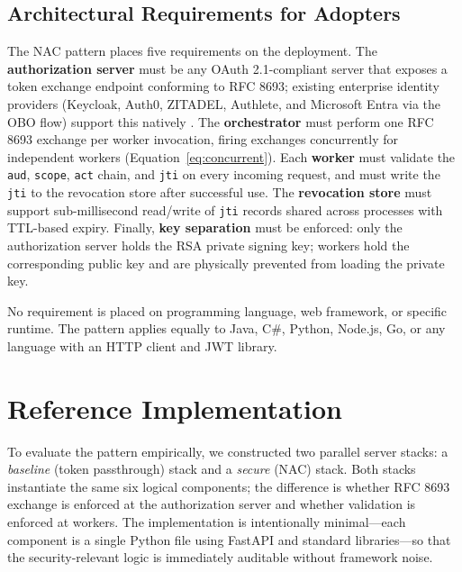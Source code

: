 \documentclass[journal]{IEEEtran}
\begin{document}
\subsection{Architectural Requirements for Adopters}

The NAC pattern places five requirements on the deployment. The
\textbf{authorization server} must be any OAuth 2.1-compliant server that
exposes a token exchange endpoint conforming to RFC 8693; existing enterprise
identity providers (Keycloak, Auth0, ZITADEL, Authlete, and Microsoft Entra via
the OBO flow) support this natively \cite{rfc8693_deploy}. The
\textbf{orchestrator} must perform one RFC 8693 exchange per worker invocation,
firing exchanges concurrently for independent workers
(Equation~\ref{eq:concurrent}). Each \textbf{worker} must validate the
\texttt{aud}, \texttt{scope}, \texttt{act} chain, and \texttt{jti} on every
incoming request, and must write the \texttt{jti} to the revocation store after
successful use. The \textbf{revocation store} must support sub-millisecond
read/write of \texttt{jti} records shared across processes with TTL-based
expiry. Finally, \textbf{key separation} must be enforced: only the
authorization server holds the RSA private signing key; workers hold the
corresponding public key and are physically prevented from loading the private
key.

No requirement is placed on programming language, web framework, or specific
runtime. The pattern applies equally to Java, C\#, Python, Node.js, Go, or any
language with an HTTP client and JWT library.


\section{Reference Implementation}
\label{sec:impl}

To evaluate the pattern empirically, we constructed two parallel server stacks:
a \textit{baseline} (token passthrough) stack and a \textit{secure} (NAC) stack.
Both stacks instantiate the same six logical components; the difference is whether
RFC 8693 exchange is enforced at the authorization server and whether validation
is enforced at workers. The implementation is intentionally minimal---each
component is a single Python file using FastAPI and standard libraries---so that
the security-relevant logic is immediately auditable without framework noise.
\end{document}
